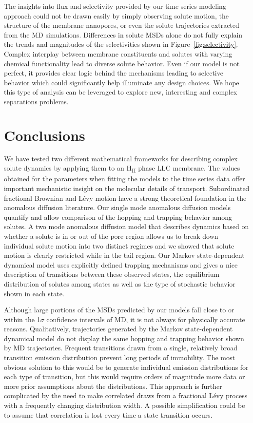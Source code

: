 \documentclass[journal=jctcce,manuscript=article]{achemso}
\begin{document}
  The insights into flux and selectivity provided by our time series modeling
  approach could not be drawn easily by simply observing solute motion, the
  structure of the membrane nanopores, or even the solute trajectories
  extracted from the MD simulations. Differences in solute MSDs alone do not
  fully explain the trends and magnitudes of the selectivities shown in
  Figure~\ref{fig:selectivity}. Complex interplay between membrane
  constituents and solutes with varying chemical functionality lead to diverse
  solute behavior. Even if our model is not perfect, it provides clear logic
  behind the mechanisms leading to selective behavior which could significantly
  help illuminate any design choices. We hope this type of analysis can be 
  leveraged to explore new, interesting and complex separations problems.
  
  \section{Conclusions}
  
  We have tested two different mathematical frameworks for describing complex
  solute dynamics by applying them to an H\textsubscript{II} phase LLC membrane. The
  values obtained for the parameters when fitting the models to the time series
  data offer important mechanistic insight on the molecular details of
  transport. Subordinated fractional Brownian and L\'evy motion have a strong
  theoretical foundation in the anomalous diffusion literature. Our single mode
  anomalous diffusion models quantify and allow comparison of the hopping and 
  trapping behavior among solutes. A two mode anomalous diffusion model that 
  describes dynamics based on whether a solute is in or out of the pore region
  allows us to break down individual solute motion into two distinct regimes 
  and we showed that solute motion is clearly restricted while in the tail 
  region. Our Markov state-dependent dynamical model uses explicitly defined 
  trapping mechanisms and gives a nice description of transitions between these 
  observed states, the equilibrium distribution of solutes among states as well
  as the type of stochastic behavior shown in each state. 
  
  Although large portions of the MSDs predicted by our models fall close to or
  within the 1$\sigma$ confidence intervals of MD, it is not always for
  physically accurate reasons. Qualitatively, trajectories generated by the 
  Markov state-dependent dynamical model do not display the same hopping and 
  trapping behavior shown by MD trajectories. Frequent transitions drawn from
  a single, relatively broad transition emission distribution prevent long
  periods of immobility. The most obvious solution to this would be to generate
  individual emission distributions for each type of transition, but this would
  require orders of magnitude more data or more prior assumptions about the 
  distributions. This approach is further complicated by the need to make 
  correlated draws from a fractional L\'evy process with a frequently changing
  distribution width. A possible simplification could be to assume that 
  correlation is lost every time a state transition occurs.
\end{document}
